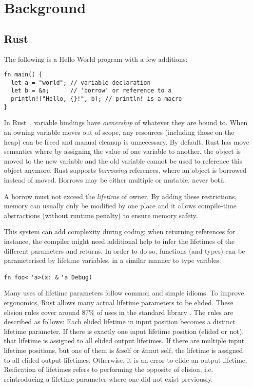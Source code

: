 \section{Background}\label{C:back} 

\subsection{Rust}

The following is a Hello World program with a few additions:

\begin{verbatim}
fn main() {
  let a = "world"; // variable declaration
  let b = &a;      // 'borrow' or reference to a
  println!("Hello, {}!", b); // println! is a macro
}
\end{verbatim}

In Rust~\cite{doc15}, variable bindings have \textit{ownership} of whatever they are bound to. When an owning variable moves out of scope, any resources (including those on the heap) can be freed and manual cleanup is unnecessary. By default, Rust has move semantics where by assigning the value of one variable to another, the object is moved to the new variable and the old variable cannot be used to reference this object anymore. Rust supports \textit{borrowing} references, where an object is borrowed instead of moved. Borrows may be either multiple or mutable, never both.

A borrow must not exceed the \textit{lifetime} of owner. By adding these restrictions, memory can usually only be modified by one place and it allows compile-time abstractions (without runtime penalty) to ensure memory safety.

This system can add complexity during coding; when returning references for instance, the compiler might need additional help to infer the lifetimes of the different parameters and returns. In order to do so, functions (and types) can be parameterised by lifetime variables, in a similar manner to type varibles.

{\verb|fn foo<|}{\color{blue} \verb|'a|}{\verb|>(x: &|}
{\color{blue} \verb|'a|}{\verb| Debug)|}

Many uses of lifetime parameters follow common and simple idioms. To improve ergonomics, Rust allows many actual lifetime parameters to be elided. These elision rules cover around 87\% of uses in the standard library \cite{elisionrules}. The rules are described as follows: Each elided lifetime in input position becomes a distinct lifetime parameter. If there is exactly one input lifetime position (elided or not), that lifetime is assigned to all elided output lifetimes. If there are multiple input lifetime positions, but one of them is \&self or \&mut self, the lifetime is assigned to all elided output lifetimes. Otherwise, it is an error to elide an output lifetime. Reification of lifetimes refers to performing the opposite of elision, i.e. reintroducing a lifetime parameter where one did not exist previously.


